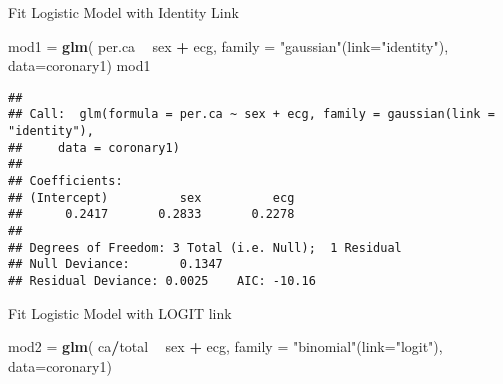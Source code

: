 \documentclass[]{article}
\newenvironment{Shaded}{\begin{snugshade}}{\end{snugshade}}
\newcommand{\KeywordTok}[1]{\textcolor[rgb]{0.13,0.29,0.53}{\textbf{#1}}}
\newcommand{\DataTypeTok}[1]{\textcolor[rgb]{0.13,0.29,0.53}{#1}}
\newcommand{\StringTok}[1]{\textcolor[rgb]{0.31,0.60,0.02}{#1}}
\newcommand{\OtherTok}[1]{\textcolor[rgb]{0.56,0.35,0.01}{#1}}
\newcommand{\OperatorTok}[1]{\textcolor[rgb]{0.81,0.36,0.00}{\textbf{#1}}}
\newcommand{\NormalTok}[1]{#1}
\begin{document}
\begin{Shaded}
\end{Shaded}

Fit Logistic Model with Identity Link

\begin{Shaded}
\begin{Highlighting}[]
\NormalTok{mod1 =}\StringTok{ }\KeywordTok{glm}\NormalTok{( per.ca }\OperatorTok{~}\StringTok{ }\NormalTok{sex }\OperatorTok{+}\StringTok{ }\NormalTok{ecg,}
            \DataTypeTok{family =} \StringTok{"gaussian"}\NormalTok{(}\DataTypeTok{link=}\StringTok{"identity"}\NormalTok{),}
            \DataTypeTok{data=}\NormalTok{coronary1)}
\NormalTok{mod1}
\end{Highlighting}
\end{Shaded}

\begin{verbatim}
## 
## Call:  glm(formula = per.ca ~ sex + ecg, family = gaussian(link = "identity"), 
##     data = coronary1)
## 
## Coefficients:
## (Intercept)          sex          ecg  
##      0.2417       0.2833       0.2278  
## 
## Degrees of Freedom: 3 Total (i.e. Null);  1 Residual
## Null Deviance:       0.1347 
## Residual Deviance: 0.0025    AIC: -10.16
\end{verbatim}

Fit Logistic Model with LOGIT link

\begin{Shaded}
\begin{Highlighting}[]
\NormalTok{mod2 =}\StringTok{ }\KeywordTok{glm}\NormalTok{( ca}\OperatorTok{/}\NormalTok{total }\OperatorTok{~}\StringTok{ }\NormalTok{sex }\OperatorTok{+}\StringTok{ }\NormalTok{ecg,}
            \DataTypeTok{family =} \StringTok{"binomial"}\NormalTok{(}\DataTypeTok{link=}\StringTok{"logit"}\NormalTok{),}
            \DataTypeTok{data=}\NormalTok{coronary1)}
\end{Highlighting}
\end{Shaded}
\end{document}

